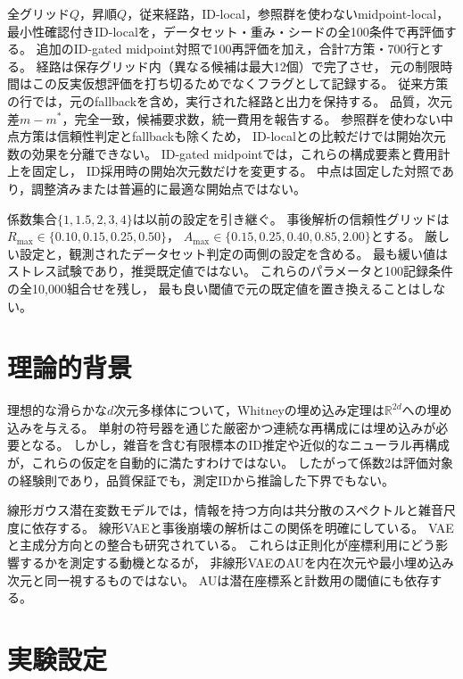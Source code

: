 \documentclass[11pt,a4paper]{ltjsarticle}
\begin{document}
全グリッド$Q$，昇順$Q$，従来経路，ID-local，参照群を使わないmidpoint-local，
最小性確認付きID-localを，データセット・重み・シードの全100条件で再評価する。
追加のID-gated midpoint対照で100再評価を加え，合計7方策・700行とする。
経路は保存グリッド内（異なる候補は最大12個）で完了させ，
元の制限時間はこの反実仮想評価を打ち切るためでなくフラグとして記録する。
従来方策の行では，元のfallbackを含め，実行された経路と出力を保持する。
品質，次元差$m-m^*$，完全一致，候補要求数，統一費用を報告する。
参照群を使わない中点方策は信頼性判定とfallbackも除くため，
ID-localとの比較だけでは開始次元数の効果を分離できない。
ID-gated midpointでは，これらの構成要素と費用計上を固定し，
ID採用時の開始次元数だけを変更する。
中点は固定した対照であり，調整済みまたは普遍的に最適な開始点ではない。

係数集合$\{1,1.5,2,3,4\}$は以前の設定を引き継ぐ。
事後解析の信頼性グリッドは$R_{\max}\in\{0.10,0.15,0.25,0.50\}$，
$A_{\max}\in\{0.15,0.25,0.40,0.85,2.00\}$とする。
厳しい設定と，観測されたデータセット判定の両側の設定を含める。
最も緩い値はストレス試験であり，推奨既定値ではない。
これらのパラメータと100記録条件の全10,000組合せを残し，
最も良い閾値で元の既定値を置き換えることはしない。

\section{理論的背景}\label{sec:theory}
理想的な滑らかな$d$次元多様体について，Whitneyの埋め込み定理は$\mathbb R^{2d}$への埋め込みを与える\cite{whitney1944}。
単射の符号器を通じた厳密かつ連続な再構成には埋め込みが必要となる。
しかし，雑音を含む有限標本のID推定や近似的なニューラル再構成が，これらの仮定を自動的に満たすわけではない。
したがって係数2は評価対象の経験則であり，品質保証でも，測定IDから推論した下界でもない。

線形ガウス潜在変数モデルでは，情報を持つ方向は共分散のスペクトルと雑音尺度に依存する。
線形VAEと事後崩壊の解析はこの関係を明確にしている\cite{tippingbishop1999ppca,lucas2019elbo}。
VAEと主成分方向との整合も研究されている\cite{rolinek2019pca}。
これらは正則化が座標利用にどう影響するかを測定する動機となるが，
非線形VAEのAUを内在次元や最小埋め込み次元と同一視するものではない。
AUは潜在座標系と計数用の閾値にも依存する。

\section{実験設定}\label{sec:setup}
\end{document}
